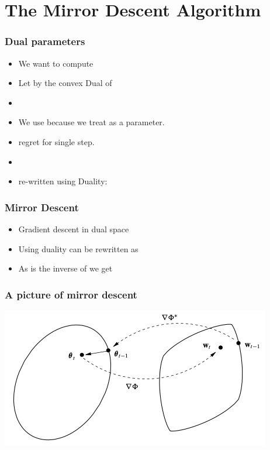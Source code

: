 \documentclass{beamer}
\begin{document}
\section{The Mirror Descent Algorithm}

\begin{frame}
  \frametitle{Dual parameters}
  \begin{itemize}
  \item We want to compute
  \item Let \R{$\Phi^*$} by the convex Dual of \R{$\Phi$}
  \item {}
    \item We use  because we treat  as a parameter.
  \item {} regret for single step.
  \item {}
  \item re-written using Duality:
  \end{itemize}
\end{frame}

\begin{frame}
  \frametitle{Mirror Descent}
  \begin{itemize}
  \item Gradient descent in dual space
  \item Using duality can be rewritten as
  \item As \R{$\nabla \Phi$} is the inverse of \R{$\nabla \Phi^*$} we get
  \end{itemize}
\end{frame}

\begin{frame}
  \frametitle{A picture of mirror descent}
\includegraphics[width=\textwidth]{figures/MirrorDescent.png}
\end{frame}
\end{document}
